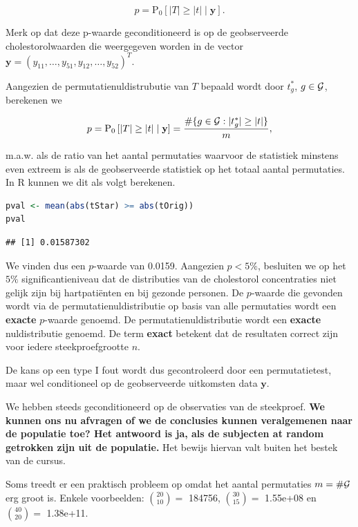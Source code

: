 \documentclass[
  12pt,dutch,coursenotes]{book}
\begin{document}
\[p=\text{P}_0\left[\vert T\vert \geq \vert t\vert \mid \mathbf{y}\right].\]

Merk op dat deze p-waarde geconditioneerd is op de geobserveerde cholestorolwaarden die weergegeven worden in de vector \(\mathbf{y}=(y_{11},\ldots,y_{51},y_{12},\ldots,y_{52})^T\).

Aangezien de permutatienuldistrubutie van \(T\) bepaald wordt door \(t^*_g\), \(g \in{\cal{G}}\), berekenen we

\[p  = \text{P}_0\left[\left\vert T\right\vert \geq \left\vert t\right\vert \mid \mathbf{y}\right] = \frac{\#\{g\in {\cal{G}}: \vert t^*_g\vert \geq \vert t \vert \}}{m},\]

m.a.w. als de ratio van het aantal permutaties waarvoor de statistiek minstens even extreem is als de geobserveerde statistiek op het totaal aantal permutaties. In R kunnen we dit als volgt berekenen.

\begin{lstlisting}[language=R]
pval <- mean(abs(tStar) >= abs(tOrig))
pval
\end{lstlisting}

\begin{lstlisting}
## [1] 0.01587302
\end{lstlisting}

We vinden dus een \(p\)-waarde van 0.0159. Aangezien \(p<5\%\), besluiten we op het \(5\%\) significantieniveau dat de distributies van de cholestorol concentraties niet gelijk zijn bij hartpatiënten en bij gezonde personen.
De \(p\)-waarde die gevonden wordt via de permutatienuldistributie op basis van alle permutaties wordt een \textbf{exacte} \(p\)-waarde genoemd. De permutatienuldistributie wordt een \textbf{exacte} nuldistributie genoemd. De term \textbf{exact} betekent dat de resultaten correct zijn voor iedere steekproefgrootte \(n\).

De kans op een type I fout wordt dus gecontroleerd door een permutatietest, maar wel conditioneel op de geobserveerde uitkomsten data \(\mathbf{y}\).

We hebben steeds geconditioneerd op de observaties van de steekproef. \textbf{We kunnen ons nu afvragen of we de conclusies kunnen veralgemenen naar de populatie toe? Het antwoord is ja, als de subjecten at random getrokken zijn uit de populatie.} Het bewijs hiervan valt buiten het bestek van de cursus.

Soms treedt er een praktisch probleem op omdat het aantal permutaties \(m=\#{\cal{G}}\) erg groot is. Enkele voorbeelden:
\(\binom{20}{10}=\) 184756, \(\binom{30}{15}=\) 1.55e+08 en \(\binom{40}{20}=\) 1.38e+11.
\end{document}
